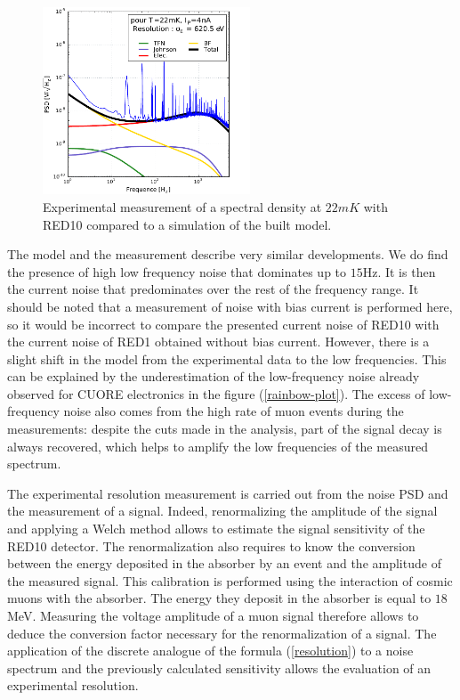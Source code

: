 \begin{figure}[!ht]
\begin{center}
\includegraphics[width=0.55\textwidth]{Images/modexp.pdf}
\end{center}
\caption{Experimental measurement of a spectral density at $22 mK$ with RED10 compared to a simulation of the built model.}
\label{noise-red10}
\end{figure}

The model and the measurement describe very similar developments. We do find the presence of high low frequency noise that dominates up to $15$Hz. It is then the current noise that predominates over the rest of the frequency range. It should be noted that a measurement of noise with bias current is performed here, so it would be incorrect to compare the presented current noise of RED10 with the current noise of RED1 obtained without bias current. However, there is a slight shift in the model from the experimental data to the low frequencies. This can be explained by the underestimation of the low-frequency noise already observed for CUORE electronics in the figure (\ref{rainbow-plot}). The excess of low-frequency noise also comes from the high rate of muon events during the measurements: despite the cuts made in the analysis, part of the signal decay is always recovered, which helps to amplify the low frequencies of the measured spectrum.

The experimental resolution measurement is carried out from the noise PSD and the measurement of a signal. Indeed, renormalizing the amplitude of the signal and applying a Welch method allows to estimate the signal sensitivity of the RED10 detector. The renormalization also requires to know the conversion between the energy deposited in the absorber by an event and the amplitude of the measured signal. This calibration is performed using the interaction of cosmic muons with the absorber. The energy they deposit in the absorber is equal to $18$MeV. Measuring the voltage amplitude of a muon signal therefore allows to deduce the conversion factor necessary for the renormalization of a signal. The application of the discrete analogue of the formula (\ref{resolution}) to a noise spectrum and the previously calculated sensitivity allows the evaluation of an experimental resolution. 


